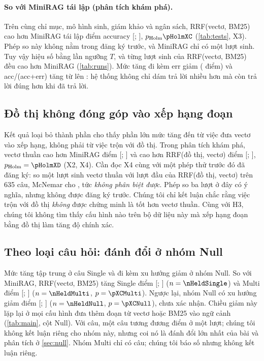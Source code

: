 \paragraph{So với MiniRAG tái lập (phân tích khám phá).}
Trên cùng chỉ mục, mô hình sinh, giám khảo và ngân sách, RRF(vectơ, BM25) cao hơn MiniRAG tái lập \diffXC{} điểm accuracy [\ciLoXC; \ciHiXC], $p_{\text{Holm}} \pHolmXC$ (\cref{tab:tests}, X3).
Phép so này không nằm trong đăng ký trước, và MiniRAG chỉ có một lượt sinh.
Tuy vậy hiệu số bằng \ratioXCT{} lần ngưỡng $T$, và từng lượt sinh của RRF(vectơ, BM25) đều cao hơn MiniRAG (\cref{tab:runs}).
Mức tăng đi kèm err giảm (\dErrXC{} điểm) và acc/(acc+err) tăng từ \precBase{} lên \precVK{}: hệ thống không chỉ dám trả lời nhiều hơn mà còn trả lời đúng hơn khi đã trả lời.

\subsection{Đồ thị không đóng góp vào xếp hạng đoạn}\label{sec:ablation}
Kết quả loại bỏ thành phần cho thấy phần lớn mức tăng đến từ việc đưa vectơ vào xếp hạng, không phải từ việc trộn với đồ thị.
Trong phân tích khám phá, vectơ thuần cao hơn MiniRAG \diffXB{} điểm [\ciLoXB; \ciHiXB] và cao hơn RRF(đồ thị, vectơ) \diffXD{} điểm [\ciLoXD; \ciHiXD], $p_{\text{Holm}} = \pHolmXD$ (X2, X4).
Cần đọc X4 cùng với một phép thử trước đó đã đăng ký: so một lượt sinh vectơ thuần với lượt đầu của RRF(đồ thị, vectơ) trên 635 câu, McNemar cho \vecVsGVpre, tức \emph{không phân biệt được}.
Phép so ba lượt ở đây có ý nghĩa, nhưng không được đăng ký trước. Chúng tôi chỉ kết luận chắc rằng việc trộn với đồ thị \emph{không} được chứng minh là tốt hơn vectơ thuần.
Cùng với H3, chúng tôi không tìm thấy cấu hình nào trên bộ dữ liệu này mà xếp hạng đoạn bằng đồ thị làm tăng độ chính xác.

\subsection{Theo loại câu hỏi: đánh đổi ở nhóm Null}\label{sec:by-type}
Mức tăng tập trung ở câu Single và đi kèm xu hướng giảm ở nhóm Null.
So với MiniRAG, RRF(vectơ, BM25) tăng Single \diffXCSingle{} điểm [\ciLoXCSingle; \ciHiXCSingle] ($n=\nHeldSingle$) và Multi \diffXCMulti{} điểm [\ciLoXCMulti; \ciHiXCMulti] ($n=\nHeldMulti$, $p=\pXCMulti$).
Ngược lại, nhóm Null có xu hướng giảm \diffXCNull{} điểm [\ciLoXCNull; \ciHiXCNull] ($n=\nHeldNull$, $p=\pXCNull$), chưa xác nhận.
Chiều giảm này lặp lại ở mọi cấu hình đưa thêm đoạn từ vectơ hoặc BM25 vào ngữ cảnh (\cref{tab:main}, cột Null).
Với \nHeldNull{} câu, một câu tương đương \ptsPerNull{} điểm ở một lượt; chúng tôi không kết luận riêng cho nhóm này, nhưng coi nó là đánh đổi lớn nhất của bài và phân tích ở \cref{sec:null}.
Nhóm Multi chỉ có \nHeldMulti{} câu; chúng tôi báo số nhưng không kết luận riêng.

